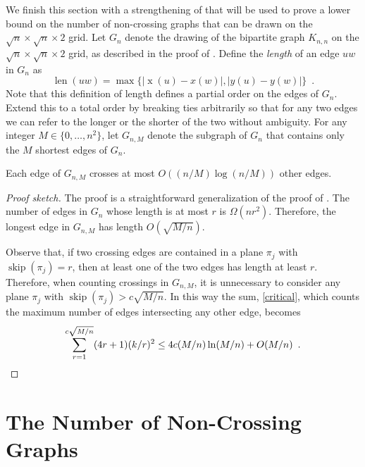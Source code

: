 \documentclass{patmorin}
\DeclareMathOperator{\x}{x}
\DeclareMathOperator{\len}{len}
\DeclareMathOperator{\skp}{skip}
\begin{document}
We finish this section with a strengthening of 
that will be used to prove a lower bound on the number of non-crossing
graphs that can be drawn on the $\sqrt{n}\times\sqrt{n}\times 2$ grid.
Let $G_n$ denote the drawing of the bipartite graph $K_{n,n}$ on the
$\sqrt{n}\times\sqrt{n}\times 2$ grid, as described in the proof of
.
Define the \emph{length} of an edge $uw$ in $G_n$ as
\[
   \len(uw) = \max\{|\x(u)-x(w)|, |y(u)-y(w)|\} \enspace .
\]
Note that this definition of length defines a partial order on the edges
of $G_n$. Extend this to a total order by breaking ties arbitrarily so
that for any two edges we can refer to the longer or the shorter of the
two without ambiguity.  For any integer $M\in\{0,\ldots,n^2\}$,
let $G_{n,M}$ denote the subgraph of $G_n$ that contains only the $M$
shortest edges of $G_n$.

\begin{lem}
  Each edge of $G_{n,M}$ crosses at most $O((n/M)\log(n/M))$ other edges.
\end{lem}

\begin{proof}[Proof sketch]
The proof is a straightforward generalization of the proof of
.  The number of edges in $G_n$ whose length is at
most $r$ is $\Omega(nr^2)$.  Therefore, the longest edge in $G_{n,M}$
has length $O(\sqrt{M/n})$.

Observe that, if two crossing edges are contained in a plane $\pi_j$
with $\skp(\pi_j)=r$, then at least one of the two edges has length at
least $r$.  Therefore, when counting crossings in $G_{n,M}$,
 it is unnecessary to consider any plane $\pi_j$ with $\skp(\pi_j)>
 c\sqrt{M/n}$.  In this way the sum, \eqref{critical}, which counts the
 maximum number of edges intersecting any other edge, becomes
\[
   \sum_{r=1}^{c\sqrt{M/n}} (4r+1)(k/r)^2 \le 4c(M/n)\ln(M/n) + O(M/n)  \enspace .
\qedhere
\]
\end{proof}

\section{The Number of Non-Crossing Graphs}

%
\end{document}
